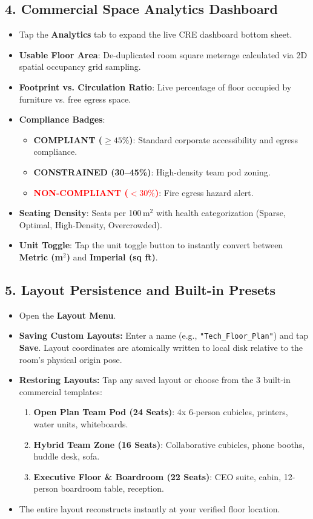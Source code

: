 \documentclass[11pt,a4paper]{article}
\begin{document}
\subsection{4. Commercial Space Analytics Dashboard}
\begin{itemize}
    \item Tap the \textbf{Analytics} tab to expand the live CRE dashboard bottom sheet.
    \item \textbf{Usable Floor Area}: De-duplicated room square meterage calculated via 2D spatial occupancy grid sampling.
    \item \textbf{Footprint vs. Circulation Ratio}: Live percentage of floor occupied by furniture vs. free egress space.
    \item \textbf{Compliance Badges}:
    \begin{itemize}[noitemsep]
        \item \textcolor{successgreen}{\textbf{COMPLIANT ($\ge 45\%$)}}: Standard corporate accessibility and egress compliance.
        \item \textcolor{accentorange}{\textbf{CONSTRAINED (30--45\%)}}: High-density team pod zoning.
        \item \textcolor{red}{\textbf{NON-COMPLIANT ($< 30\%$)}}: Fire egress hazard alert.
    \end{itemize}
    \item \textbf{Seating Density}: Seats per 100\,m$^2$ with health categorization (Sparse, Optimal, High-Density, Overcrowded).
    \item \textbf{Unit Toggle}: Tap the unit toggle button to instantly convert between \textbf{Metric (m$^2$)} and \textbf{Imperial (sq ft)}.
\end{itemize}

\subsection{5. Layout Persistence and Built-in Presets}
\begin{itemize}
    \item Open the \textbf{Layout Menu}.
    \item \textbf{Saving Custom Layouts:} Enter a name (e.g., \texttt{"Tech\_Floor\_Plan"}) and tap \textbf{Save}. Layout coordinates are atomically written to local disk relative to the room's physical origin pose.
    \item \textbf{Restoring Layouts:} Tap any saved layout or choose from the 3 built-in commercial templates:
    \begin{enumerate}[noitemsep]
        \item \textbf{Open Plan Team Pod (24 Seats)}: 4x 6-person cubicles, printers, water units, whiteboards.
        \item \textbf{Hybrid Team Zone (16 Seats)}: Collaborative cubicles, phone booths, huddle desk, sofa.
        \item \textbf{Executive Floor \& Boardroom (22 Seats)}: CEO suite, cabin, 12-person boardroom table, reception.
    \end{enumerate}
    \item The entire layout reconstructs instantly at your verified floor location.
\end{itemize}
\end{document}
